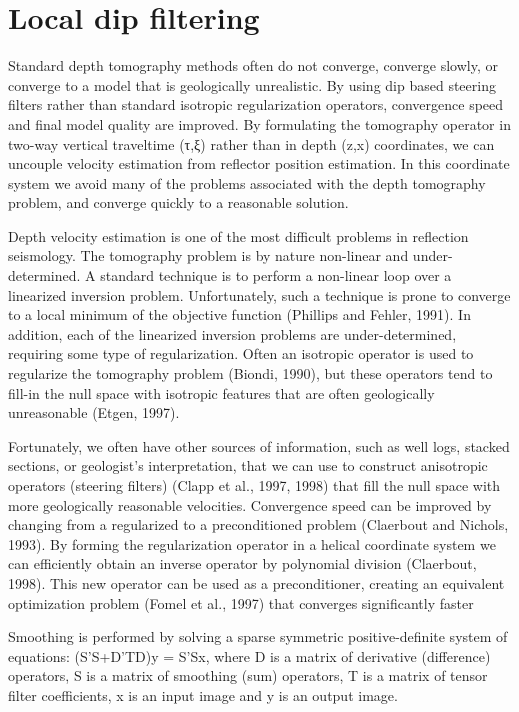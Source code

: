 \section{Local dip filtering}
Standard depth tomography methods often do not converge, converge slowly, or
converge to a model that is geologically unrealistic. By using dip based steering
filters rather than standard isotropic regularization operators, convergence speed
and final model quality are improved. By formulating the tomography operator in
two-way vertical traveltime (τ,ξ) rather than in depth (z,x) coordinates, we can
uncouple velocity estimation from reflector position estimation. In this coordinate
system we avoid many of the problems associated with the depth tomography
problem, and converge quickly to a reasonable solution.

Depth velocity estimation is one of the most difficult problems in reflection
seismology.
The tomography problem is by nature non-linear and under-determined. A
standard technique is to perform a non-linear loop over a linearized inversion
problem.
Unfortunately, such a technique is prone to converge to a local minimum of the
objective function (Phillips and Fehler, 1991). In addition, each of the linearized
inversion
problems are under-determined, requiring some type of regularization. Often
an isotropic operator is used to regularize the tomography problem (Biondi, 1990),
but these operators tend to fill-in the null space with isotropic features that are
often
geologically unreasonable (Etgen, 1997).

Fortunately, we often have other sources of information, such as well logs, stacked
sections, or geologist’s interpretation, that we can use to construct anisotropic
operators
(steering filters) (Clapp et al., 1997, 1998) that fill the null space with more
geologically reasonable velocities. Convergence speed can be improved by changing
from a regularized to a preconditioned problem (Claerbout and Nichols, 1993). By
forming the regularization operator in a helical coordinate system we can efficiently
obtain an inverse operator by polynomial division (Claerbout, 1998). This new operator
can be used as a preconditioner, creating an equivalent optimization problem
(Fomel et al., 1997) that converges significantly faster

Smoothing is performed by solving a sparse symmetric positive-definite
system of equations: (S'S+D'TD)y = S'Sx, where D is a matrix of 
derivative (difference) operators, S is a matrix of smoothing (sum)
operators, T is a matrix of tensor filter coefficients, x is an input 
image and y is an output image.

